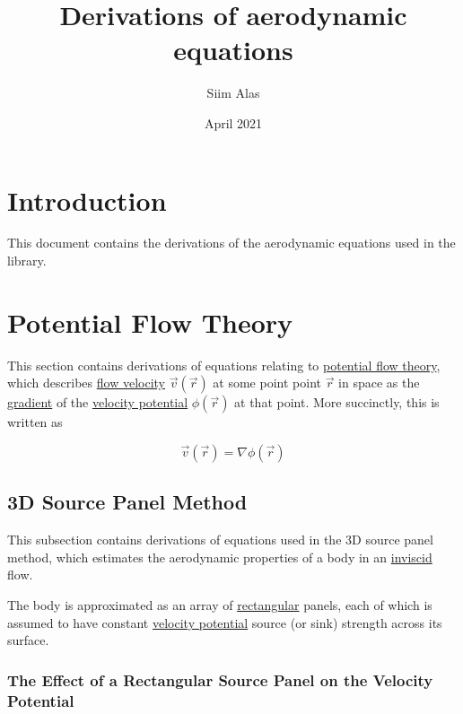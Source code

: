 ﻿\documentclass{article}
\title{Derivations of aerodynamic equations}
\author{Siim Alas}
\date{April 2021}
\begin{document}
\maketitle

\section*{Introduction}

This document contains the derivations of the aerodynamic equations used in the library.

\section{Potential Flow Theory}

This section contains derivations of equations relating to \href{https://en.wikipedia.org/wiki/Potential_flow}{potential flow theory}, which describes \href{https://en.wikipedia.org/wiki/Flow_velocity}{flow velocity} $\vec{v}(\vec{r})$ at some point point $\vec{r}$ in space as the \href{https://en.wikipedia.org/wiki/Gradient}{gradient} of the \href{https://en.wikipedia.org/wiki/Velocity_potential}{velocity potential} $\phi(\vec{r})$ at that point. More succinctly, this is written as

\begin{equation}
    \label{eq:RelationOfVelocityAndVelocityPotential}
    \vec{v}(\vec{r}) = \nabla \phi(\vec{r})
\end{equation}

\subsection{3D Source Panel Method}

This subsection contains derivations of equations used in the 3D source panel method, which estimates the aerodynamic properties of a body in an \href{https://en.wikipedia.org/wiki/Inviscid_flow}{inviscid} flow.

The body is approximated as an array of \href{https://en.wikipedia.org/wiki/Rectangle}{rectangular} panels, each of which is assumed to have constant \href{https://en.wikipedia.org/wiki/Velocity_potential}{velocity potential} source (or sink) strength across its surface.

\subsubsection{The Effect of a Rectangular Source Panel on the Velocity Potential}
\end{document}
